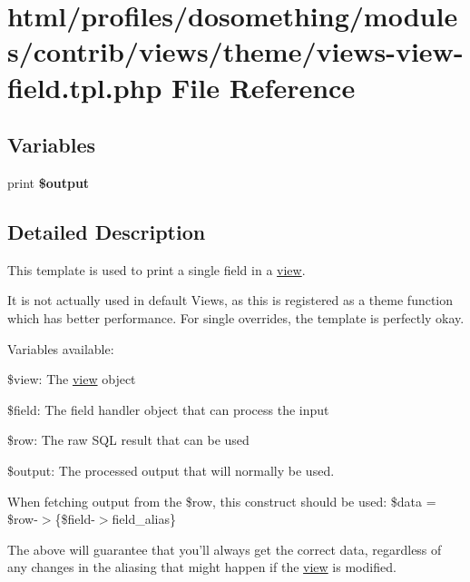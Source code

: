 \hypertarget{views-view-field_8tpl_8php}{
\section{html/profiles/dosomething/modules/contrib/views/theme/views-\/view-\/field.tpl.php File Reference}
\label{views-view-field_8tpl_8php}
}
\subsection*{Variables}
\begin{DoxyCompactItemize}
\item 
\hypertarget{views-view-field_8tpl_8php_a3b3e916294d02621688f0b1b64f95628}{
print {\bfseries \$output}}
\label{views-view-field_8tpl_8php_a3b3e916294d02621688f0b1b64f95628}

\end{DoxyCompactItemize}


\subsection{Detailed Description}
This template is used to print a single field in a \hyperlink{classview}{view}.

It is not actually used in default Views, as this is registered as a theme function which has better performance. For single overrides, the template is perfectly okay.

Variables available:
\begin{DoxyItemize}
\item \$view: The \hyperlink{classview}{view} object
\item \$field: The field handler object that can process the input
\item \$row: The raw SQL result that can be used
\item \$output: The processed output that will normally be used.
\end{DoxyItemize}

When fetching output from the \$row, this construct should be used: \$data = \$row-\/$>$\{\$field-\/$>$field\_\-alias\}

The above will guarantee that you'll always get the correct data, regardless of any changes in the aliasing that might happen if the \hyperlink{classview}{view} is modified. 